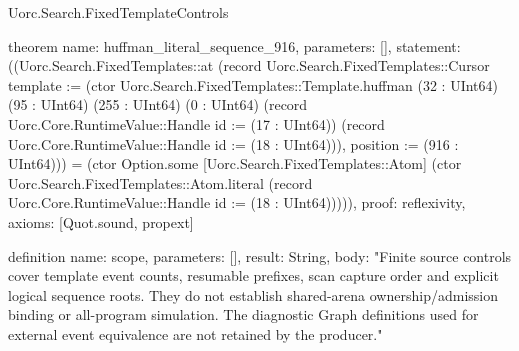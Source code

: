 \begin{lexlean}{Uorc.Search.FixedTemplateControls}
\begin{semanticmodule}
theorem{
  name: huffman_literal_sequence_916,
  parameters: [],
  statement: ((Uorc.Search.FixedTemplates::at (record Uorc.Search.FixedTemplates::Cursor {template := (ctor Uorc.Search.FixedTemplates::Template.huffman (32 : UInt64) (95 : UInt64) (255 : UInt64) (0 : UInt64) (record Uorc.Core.RuntimeValue::Handle {id := (17 : UInt64)}) (record Uorc.Core.RuntimeValue::Handle {id := (18 : UInt64)})), position := (916 : UInt64)})) = (ctor Option.some [Uorc.Search.FixedTemplates::Atom] (ctor Uorc.Search.FixedTemplates::Atom.literal (record Uorc.Core.RuntimeValue::Handle {id := (18 : UInt64)})))),
  proof: reflexivity{},
  axioms: [Quot.sound, propext]
}

definition{
  name: scope,
  parameters: [],
  result: String,
  body: "Finite source controls cover template event counts, resumable prefixes, scan capture order and explicit logical sequence roots. They do not establish shared-arena ownership/admission binding or all-program simulation. The diagnostic Graph definitions used for external event equivalence are not retained by the producer."
}
\end{semanticmodule}
\end{lexlean}
